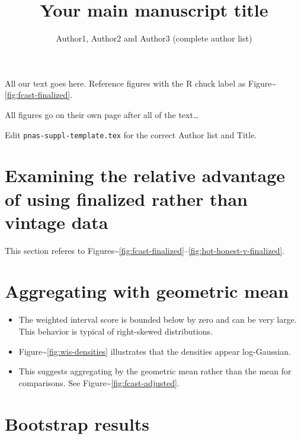 \documentclass[9pt,twoside,lineno]{pnas-new}
\title{Your main manuscript title}
\author{Author1, Author2 and Author3 (complete author list)}
\providecommand{\tightlist}{%
  \setlength{\itemsep}{0pt}\setlength{\parskip}{0pt}}
\begin{document}
\instructionspage

\maketitle

\SItext

All our text goes here. Reference figures with the R chuck label as
Figure\textasciitilde{}\ref{fig:fcast-finalized}.

All figures go on their own page after all of the text\ldots{}

Edit \texttt{pnas-suppl-template.tex} for the correct Author list and
Title.

\hypertarget{examining-the-relative-advantage-of-using-finalized-rather-than-vintage-data}{%
\section{Examining the relative advantage of using finalized rather than
vintage
data}\label{examining-the-relative-advantage-of-using-finalized-rather-than-vintage-data}}

This section referes to
Figures\textasciitilde{}\ref{fig:fcast-finalized}--\ref{fig:hot-honest-v-finalized}.

\hypertarget{aggregating-with-geometric-mean}{%
\section{Aggregating with geometric
mean}\label{aggregating-with-geometric-mean}}

\begin{itemize}
\tightlist
\item
  The weighted interval score is bounded below by zero and can be very
  large. This behavior is typical of right-skewed distributions.
\item
  Figure\textasciitilde{}\ref{fig:wis-densities} illustrates that the
  densities appear log-Gaussian.
\item
  This suggests aggregating by the geometric mean rather than the mean
  for comparisons. See Figure\textasciitilde{}\ref{fig:fcast-adjusted}.
\end{itemize}

\hypertarget{bootstrap-results}{%
\section{Bootstrap results}\label{bootstrap-results}}
\end{document}
